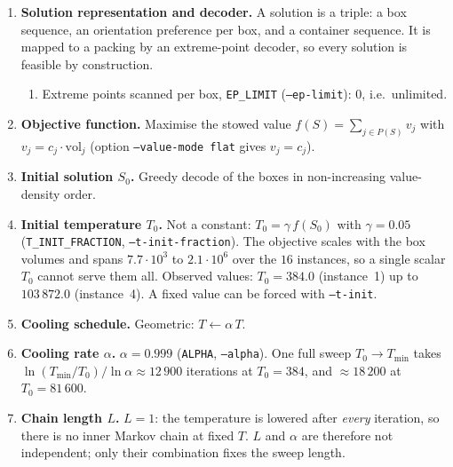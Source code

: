 \begin{enumerate}

  \item \textbf{Solution representation and decoder.}
        A solution is a triple: a box sequence, an orientation preference per
        box, and a container sequence. It is mapped to a packing by an
        extreme-point decoder, so every solution is feasible by construction.
        \begin{enumerate}
          \item Extreme points scanned per box, \texttt{EP\_LIMIT}
                (\texttt{--ep-limit}): $0$, i.e.\ unlimited.
        \end{enumerate}

  \item \textbf{Objective function.}
        Maximise the stowed value $f(S)=\sum_{j\in P(S)} v_j$ with
        $v_j = c_j \cdot \mathrm{vol}_j$ (option \texttt{--value-mode flat}
        gives $v_j = c_j$).

  \item \textbf{Initial solution $S_0$.}
        Greedy decode of the boxes in non-increasing value-density order.

  \item \textbf{Initial temperature $T_0$.}
        Not a constant: $T_0 = \gamma\, f(S_0)$ with
        $\gamma = 0.05$ (\texttt{T\_INIT\_FRACTION}, \texttt{--t-init-fraction}).
        The objective scales with the box volumes and spans
        $7.7\cdot 10^{3}$ to $2.1\cdot 10^{6}$ over the $16$ instances, so a
        single scalar $T_0$ cannot serve them all. Observed values:
        $T_0 = 384.0$ (instance~1) up to $103\,872.0$ (instance~4).
        A fixed value can be forced with \texttt{--t-init}.

  \item \textbf{Cooling schedule.}
        Geometric: $T \leftarrow \alpha\,T$.

  \item \textbf{Cooling rate $\alpha$.}
        $\alpha = 0.999$ (\texttt{ALPHA}, \texttt{--alpha}). One full sweep
        $T_0 \rightarrow T_{\min}$ takes
        $\ln(T_{\min}/T_0)/\ln\alpha \approx 12\,900$ iterations at
        $T_0 = 384$, and $\approx 18\,200$ at $T_0 = 81\,600$.

  \item \textbf{Chain length $L$.}
        $L = 1$: the temperature is lowered after \emph{every} iteration, so
        there is no inner Markov chain at fixed $T$. $L$ and $\alpha$ are
        therefore not independent; only their combination fixes the sweep
        length.


\end{enumerate}
